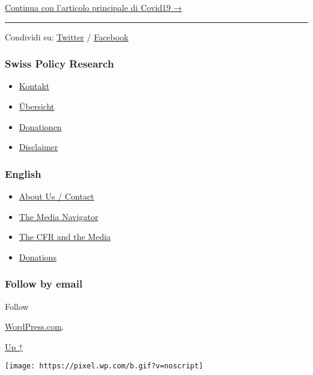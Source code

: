\href{https://swprs.org/un-medico-svizzero-su-covid-19/}{Continua con
l'articolo principale di Covid19 →}

\begin{center}\rule{0.5\linewidth}{\linethickness}\end{center}

Condividi su:
\href{https://twitter.com/intent/tweet?url=https://swprs.org/corona-media-propaganda-it/}{Twitter}
/
\href{https://www.facebook.com/share.php?u=https://swprs.org/corona-media-propaganda-it/}{Facebook}

\hypertarget{swiss-policy-research}{%
\subsubsection{Swiss Policy Research}\label{swiss-policy-research}}

\begin{itemize}
\tightlist
\item
  \href{https://swprs.org/kontakt/}{Kontakt}
\item
  \href{https://swprs.org/uebersicht/}{Übersicht}
\item
  \href{https://swprs.org/donationen/}{Donationen}
\item
  \href{https://swprs.org/disclaimer/}{Disclaimer}
\end{itemize}

\hypertarget{english}{%
\subsubsection{English}\label{english}}

\begin{itemize}
\tightlist
\item
  \href{https://swprs.org/contact/}{About Us / Contact}
\item
  \href{https://swprs.org/media-navigator/}{The Media Navigator}
\item
  \href{https://swprs.org/the-american-empire-and-its-media/}{The CFR
  and the Media}
\item
  \href{https://swprs.org/donations/}{Donations}
\end{itemize}

\hypertarget{follow-by-email}{%
\subsubsection{Follow by email}\label{follow-by-email}}

Follow

\href{https://wordpress.com/?ref=footer_custom_com}{WordPress.com}.

\protect\hyperlink{}{Up ↑}

\texttt{[image: https://pixel.wp.com/b.gif?v=noscript]}
